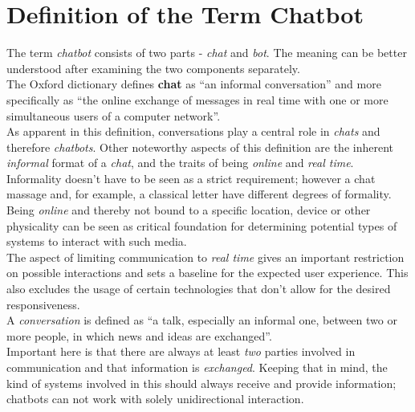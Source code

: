 \section{Definition of the Term Chatbot}
\label{defchatbot}


The term \emph{chatbot} consists of two parts - \emph{chat} and \emph{bot}.
The meaning can be better understood after examining the two components separately.
\\

The Oxford dictionary defines \textbf{chat} as ``an informal conversation'' and more specifically as ``the online exchange of messages in real time with one or more simultaneous users of a computer network''\cite{oxfordchat}.
\\
As apparent in this definition, conversations play a central role in \emph{chats} and therefore \emph{chatbots}.
Other noteworthy aspects of this definition are the inherent \emph{informal} format of a \emph{chat},
and the traits of being \emph{online} and \emph{real time}.
\\

Informality doesn't have to be seen as a strict requirement; however a chat massage and, for example, a classical letter have different degrees of formality.
\\

Being \emph{online} and thereby not bound to a specific location, device or other physicality can be seen as critical foundation for determining potential types of systems to interact with such media.
\\

The aspect of limiting communication to \emph{real time} gives an important restriction on possible interactions and sets a baseline for the expected user experience.
This also excludes the usage of certain technologies that don't allow for the desired responsiveness.
\\

A \emph{conversation} is defined as ``a talk, especially an informal one, between two or more people, in which news and ideas are exchanged''\cite{oxfordconversation}.
\\
Important here is that there are always at least \emph{two} parties involved in communication and that information is \emph{exchanged}.
Keeping that in mind, the kind of systems involved in this should always receive and provide information;
chatbots can not work with solely unidirectional interaction.
\\

